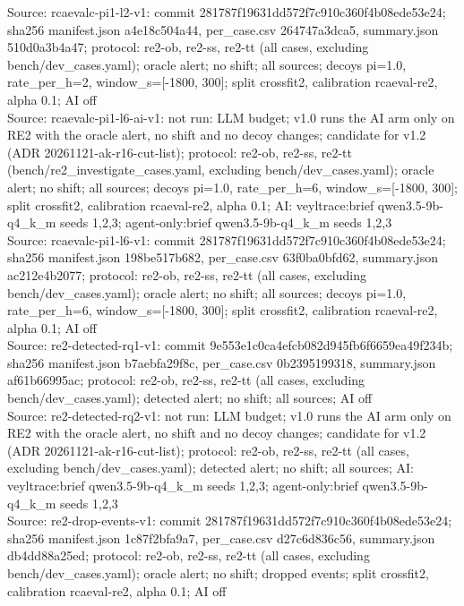 \begin{table}[t]
Source: rcaevalc-pi1-l2-v1: commit 281787f19631dd572f7c910c360f4b08ede53e24; sha256 manifest.json a4e18c504a44, per\_case.csv 264747a3dca5, summary.json 510d0a3b4a47; protocol: re2-ob, re2-ss, re2-tt (all cases, excluding bench/dev\_cases.yaml); oracle alert; no shift; all sources; decoys pi=1.0, rate\_per\_h=2, window\_s=[-1800, 300]; split crossfit2, calibration rcaeval-re2, alpha 0.1; AI off\\
Source: rcaevalc-pi1-l6-ai-v1: not run: LLM budget; v1.0 runs the AI arm only on RE2 with the oracle alert, no shift and no decoy changes; candidate for v1.2 (ADR 20261121-ak-r16-cut-list); protocol: re2-ob, re2-ss, re2-tt (bench/re2\_investigate\_cases.yaml, excluding bench/dev\_cases.yaml); oracle alert; no shift; all sources; decoys pi=1.0, rate\_per\_h=6, window\_s=[-1800, 300]; split crossfit2, calibration rcaeval-re2, alpha 0.1; AI: veyltrace:brief qwen3.5-9b-q4\_k\_m seeds 1,2,3; agent-only:brief qwen3.5-9b-q4\_k\_m seeds 1,2,3\\
Source: rcaevalc-pi1-l6-v1: commit 281787f19631dd572f7c910c360f4b08ede53e24; sha256 manifest.json 198be517b682, per\_case.csv 63f0ba0bfd62, summary.json ac212e4b2077; protocol: re2-ob, re2-ss, re2-tt (all cases, excluding bench/dev\_cases.yaml); oracle alert; no shift; all sources; decoys pi=1.0, rate\_per\_h=6, window\_s=[-1800, 300]; split crossfit2, calibration rcaeval-re2, alpha 0.1; AI off\\
Source: re2-detected-rq1-v1: commit 9e553e1c0ca4efcb082d945fb6f6659ea49f234b; sha256 manifest.json b7aebfa29f8c, per\_case.csv 0b2395199318, summary.json af61b66995ac; protocol: re2-ob, re2-ss, re2-tt (all cases, excluding bench/dev\_cases.yaml); detected alert; no shift; all sources; AI off\\
Source: re2-detected-rq2-v1: not run: LLM budget; v1.0 runs the AI arm only on RE2 with the oracle alert, no shift and no decoy changes; candidate for v1.2 (ADR 20261121-ak-r16-cut-list); protocol: re2-ob, re2-ss, re2-tt (all cases, excluding bench/dev\_cases.yaml); detected alert; no shift; all sources; AI: veyltrace:brief qwen3.5-9b-q4\_k\_m seeds 1,2,3; agent-only:brief qwen3.5-9b-q4\_k\_m seeds 1,2,3\\
Source: re2-drop-events-v1: commit 281787f19631dd572f7c910c360f4b08ede53e24; sha256 manifest.json 1c87f2bfa9a7, per\_case.csv d27c6d836c56, summary.json db4dd88a25ed; protocol: re2-ob, re2-ss, re2-tt (all cases, excluding bench/dev\_cases.yaml); oracle alert; no shift; dropped events; split crossfit2, calibration rcaeval-re2, alpha 0.1; AI off\\

\end{table}
